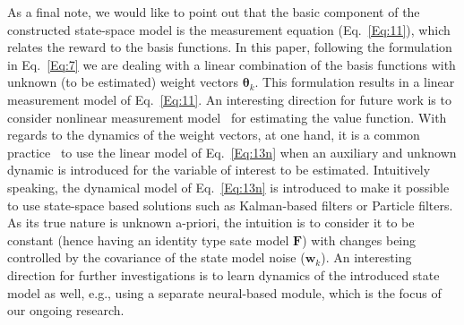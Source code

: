 \documentclass{ieeeaccess}
\def\k{_{k}}
\def\F{\bm{F}}
\def\w{\bm{w}}
\begin{document}
As a final note,  we would like to point out that the basic component of the constructed state-space model is the measurement equation (Eq.~\eqref{Eq:11}), which relates the reward to the basis functions. In this paper, following the formulation in Eq.~\eqref{Eq:7} we are dealing with a linear combination of the basis functions with unknown (to be estimated) weight vectors $\bm{\theta}\k$. This formulation results in a linear measurement model of Eq.~\eqref{Eq:11}. An  interesting direction for future work is to consider nonlinear measurement model~\cite{23} for estimating the value function. With regards to the dynamics of the weight vectors, at one hand, it is a common practice~\cite{AK1} to use the linear model of Eq.~\eqref{Eq:13n} when an auxiliary and unknown dynamic is introduced for the variable of interest to be estimated. Intuitively speaking, the dynamical model of Eq.~\eqref{Eq:13n} is introduced to make it possible to use state-space based solutions such as Kalman-based filters  or Particle filters.  As its true nature is unknown a-priori, the intuition is to consider it to be constant (hence having an identity type sate model $\F$) with changes being controlled by the covariance of the state model noise ($\w\k$). An interesting direction for further investigations is to learn dynamics of the introduced state model as well, e.g., using a separate neural-based module, which is the focus of our ongoing research.
\end{document}
